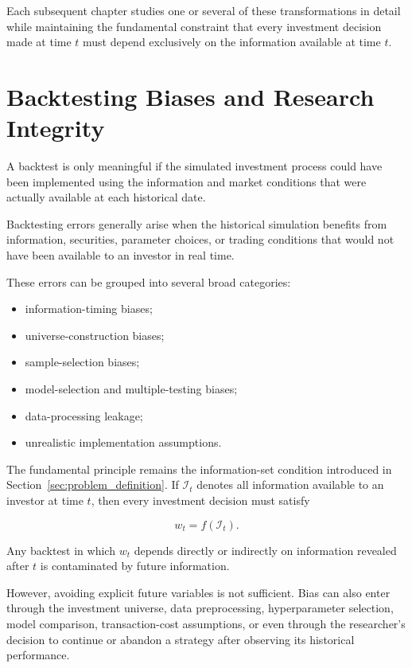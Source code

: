 \documentclass[11pt,a4paper]{article}
\begin{document}
Each subsequent chapter studies one or several of these transformations in
detail while maintaining the fundamental constraint that every investment
decision made at time $t$ must depend exclusively on the information available
at time $t$.


\section{Backtesting Biases and Research Integrity}

A backtest is only meaningful if the simulated investment process could have been
implemented using the information and market conditions that were actually
available at each historical date.

Backtesting errors generally arise when the historical simulation benefits from
information, securities, parameter choices, or trading conditions that would
not have been available to an investor in real time.

These errors can be grouped into several broad categories:

\begin{itemize}
    \item information-timing biases;
    \item universe-construction biases;
    \item sample-selection biases;
    \item model-selection and multiple-testing biases;
    \item data-processing leakage;
    \item unrealistic implementation assumptions.
\end{itemize}

The fundamental principle remains the information-set condition introduced in
Section~\ref{sec:problem_definition}. If $\mathcal{I}_t$ denotes all information
available to an investor at time $t$, then every investment decision must satisfy

\begin{equation}
\boxed{
w_t=f(\mathcal{I}_t).
}
\end{equation}

Any backtest in which $w_t$ depends directly or indirectly on information
revealed after $t$ is contaminated by future information.

However, avoiding explicit future variables is not sufficient. Bias can also
enter through the investment universe, data preprocessing, hyperparameter
selection, model comparison, transaction-cost assumptions, or even through the
researcher's decision to continue or abandon a strategy after observing its
historical performance.
\end{document}
